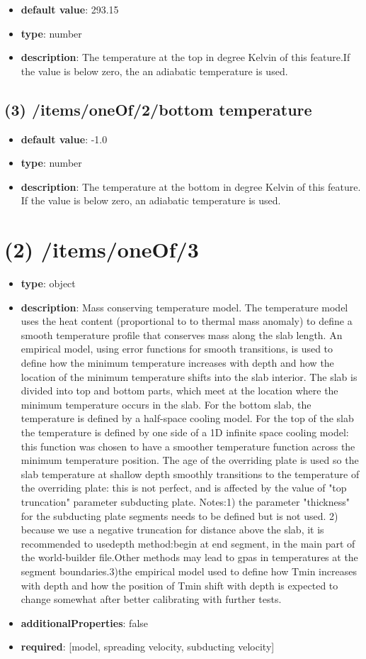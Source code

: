 \begin{itemize}[leftmargin=3em]\item {\bf default value}: 293.15
\item {\bf type}: number
\item {\bf description}: The temperature at the top in degree Kelvin of this feature.If the value is below zero, the an adiabatic temperature is used.
\end{itemize}\subsection{(3) /items/oneOf/2/bottom temperature}
\begin{itemize}[leftmargin=3em]\item {\bf default value}: -1.0
\item {\bf type}: number
\item {\bf description}: The temperature at the bottom in degree Kelvin of this feature. If the value is below zero, an adiabatic temperature is used.
\end{itemize}\section{(2) /items/oneOf/3}
\begin{itemize}[leftmargin=2em]\item {\bf type}: object
\item {\bf description}: Mass conserving temperature model. The temperature model uses the heat content (proportional to to thermal mass anomaly) to define a smooth temperature profile that conserves mass along the slab length. An empirical model, using error functions for smooth transitions, is used to  define how the minimum temperature increases with depth and how the location of the minimum temperature shifts into the slab interior. The slab is divided into top and bottom parts, which meet at the location where the minimum temperature occurs in the slab. For the bottom slab, the temperature is defined by a half-space cooling model. For the top of the slab the temperature is defined by one side of a 1D infinite space cooling model: this function was chosen to have a smoother temperature function across the minimum temperature position. The age of the overriding plate is used so the slab temperature at shallow depth smoothly transitions to the temperature of the overriding plate: this is not perfect, and is affected by the value of "top truncation" parameter subducting plate. Notes:1) the parameter "thickness" for the subducting plate segments needs to be defined but is not used. 2) because we use a negative truncation for distance above the slab, it is recommended to usedepth method:begin at end segment, in the main part of the world-builder file.Other methods may lead to gpas in temperatures at the segment boundaries.3)the empirical model used to define how Tmin increases with depth and how the position of Tmin shift with depth is expected to change somewhat after better calibrating with further tests.
\item {\bf additionalProperties}: false
\item {\bf required}: [model, spreading velocity, subducting velocity]\end{itemize}
